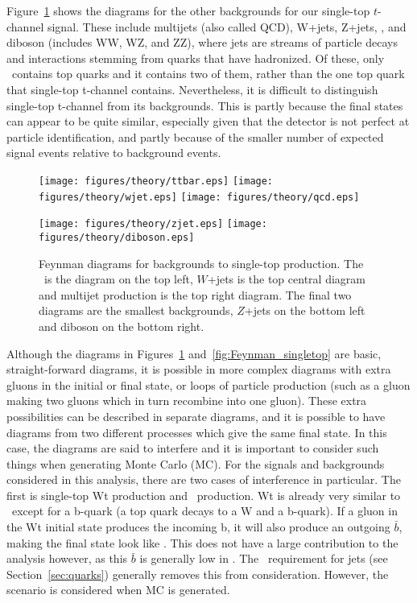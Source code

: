 Figure~\ref{fig:Feynman_background} shows the diagrams for the other backgrounds for our single-top $t$-channel signal.  These include multijets (also called QCD), W+jets, Z+jets, \ttbar, and diboson (includes WW, WZ, and ZZ), where jets are streams of particle decays and interactions stemming from quarks that have hadronized.  Of these, only \ttbar~contains top quarks and it contains two of them, rather than the one top quark that single-top t-channel contains.  Nevertheless, it is difficult to distinguish single-top t-channel from its backgrounds.  This is partly because the final states can appear to be quite similar, especially given that the detector is not perfect at particle identification, and partly because of the smaller number of expected signal events relative to background events.
 
\begin{figure}[!h!tpb]
 \centering
 \texttt{[image: figures/theory/ttbar.eps]}
 \texttt{[image: figures/theory/wjet.eps]}
 \texttt{[image: figures/theory/qcd.eps]}

\vspace{8.00mm}

 \texttt{[image: figures/theory/zjet.eps]}
 \texttt{[image: figures/theory/diboson.eps]}
 \caption{Feynman diagrams for backgrounds to single-top production.  The \ttbar~is the diagram on the top left, $W$+jets is the top central diagram and multijet production is the top right diagram.  The final two diagrams are the smallest backgrounds, $Z$+jets on the bottom left and diboson on the bottom right.}
 \label{fig:Feynman_background}
 \end{figure}

Although the diagrams in Figures~\ref{fig:Feynman_background} and~\ref{fig:Feynman_singletop} are basic, straight-forward diagrams, it is possible in more complex diagrams with extra gluons in the initial or final state, or loops of particle production (such as a gluon making two gluons which in turn recombine into one gluon).  These extra possibilities can be described in separate diagrams, and it is possible to have diagrams from two different processes which give the same final state.  In this case, the diagrams are said to interfere and it is important to consider such things when generating Monte Carlo (MC).  For the signals and backgrounds considered in this analysis, there are two cases of interference in particular.  The first is single-top Wt production and \ttbar~production.  Wt is already very similar to \ttbar~except for a b-quark (a top quark decays to a W and a b-quark).  If a gluon in the Wt initial state produces the incoming b, it will also produce an outgoing $\bar{b}$, making the final state look like \ttbar.  This does not have a large contribution to the analysis however, as this $\bar{b}$ is generally low in \pt.  The \pt~requirement for jets (see Section~\ref{sec:quarks}) generally removes this from consideration.  However, the scenario is considered when MC is generated.

